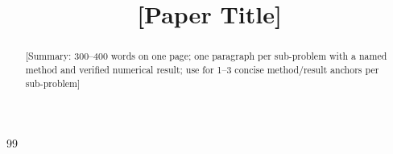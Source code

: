\documentclass[bwprint]{apmcmthesis}
\title{[Paper Title]}
\begin{document}
\makecontrolsheet
\maketitle

\begin{abstract}

[Summary: 300--400 words on one page; one paragraph per sub-problem with a named method and verified numerical result; use \textbf{} for 1--3 concise method/result anchors per sub-problem]

\keywords{[Keyword1]; [Keyword2]; [Keyword3]}
\end{abstract}

\newpage
\newpage









\begin{thebibliography}{99}
\end{thebibliography}

\begin{appendices}

\end{appendices}
\end{document}
